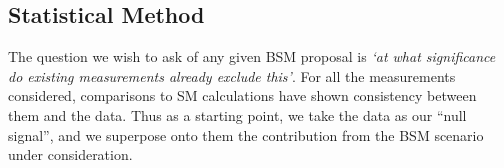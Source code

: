 \documentclass[floatfix]{article}
\begin{document}
\subsection{Statistical Method}

The question we wish to ask of any given BSM proposal is {\it `at what significance do existing measurements already exclude this'}. 
For all the measurements considered, comparisons to SM calculations have shown consistency between them and the data. Thus as a starting point, we take the
data as our ``null signal'', and we superpose onto them the contribution from the BSM scenario under consideration.
\end{document}

